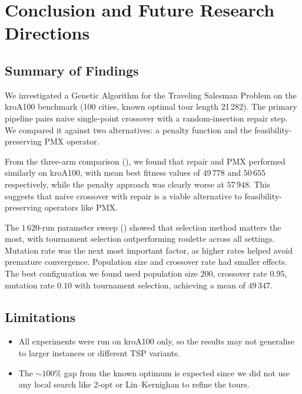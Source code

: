 \chapter{Conclusion and Future Research Directions}
\label{SecConclusion}

\section{Summary of Findings}
\label{Conc:Summary}

We investigated a Genetic Algorithm for the Traveling Salesman Problem on the
kroA100 benchmark (100 cities, known optimal tour length 21\,282). The primary
pipeline pairs naive single-point crossover with a random-insertion repair
step. We compared it against two alternatives: a penalty function and the
feasibility-preserving PMX operator.

From the three-arm comparison (), we found that repair and
PMX performed similarly on kroA100, with mean best fitness values of $49\,778$
and $50\,655$ respectively, while the penalty approach was clearly worse at
$57\,948$. This suggests that naive crossover with repair is a viable
alternative to feasibility-preserving operators like PMX.

The $1\,620$-run parameter sweep () showed that selection
method matters the most, with tournament selection outperforming roulette
across all settings. Mutation rate was the next most important factor, as
higher rates helped avoid premature convergence. Population size and crossover
rate had smaller effects. The best configuration we found used population size
$200$, crossover rate $0.95$, mutation rate $0.10$ with tournament selection,
achieving a mean of $49\,347$.

\section{Limitations}
\label{Conc:Limitations}

\begin{itemize}[nosep]
    \item All experiments were run on kroA100 only, so the results may not
    generalise to larger instances or different TSP variants.

    \item The $\sim\!100\%$ gap from the known optimum is expected since we
    did not use any local search like 2-opt or Lin--Kernighan to refine
    the tours.
\end{itemize}

